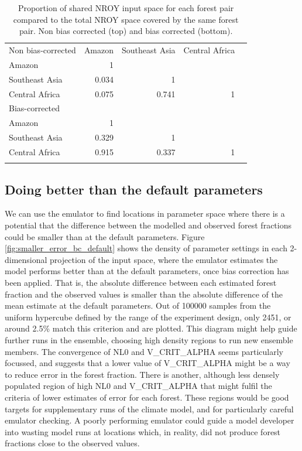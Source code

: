 \documentclass[gmd, manuscript]{copernicus}
\begin{document}
\begin{table}[t]
\caption{Proportion of shared NROY input space for each forest pair compared to the total NROY space covered by the same forest pair. Non bias corrected (top) and bias corrected (bottom).}
\begin{tabular}{lrrrr}
\tophline

Non bias-corrected    & Amazon & Southeast Asia & Central Africa  \\
\middlehline
Amazon                &          1        &             &     \\
Southeast Asia      &        0.034  &           1   &    \\
Central Africa         &    0.075 &  0.741  &   1 \\
\bottomhline

\tophline

Bias-corrected      &   &    & \\
\middlehline
Amazon                &          1        &             &     \\
Southeast Asia      &        0.329  &           1   &    \\
Central Africa         &    0.915 & 0.337  &   1 \\
\bottomhline
\end{tabular}
\belowtable{} %
\label{tab:shared_space}
\end{table}




\subsection{Doing better than the default parameters}\label{ssec:better_than_default}
We can use the emulator to find locations in parameter space where there is a potential that the difference between the modelled and observed forest fractions could be smaller than at the default parameters. Figure \ref{fig:smaller_error_bc_default} shows the density of parameter settings in each 2-dimensional projection of the input space, where the emulator estimates the model performs better than at the default parameters, once bias correction has been applied. That is, the absolute difference between each estimated forest fraction and the observed values is smaller than the absolute difference of the mean estimate at the default parameters. Out of 100000 samples from the uniform hypercube defined by the range of the experiment design, only 2451, or around 2.5\% match this criterion and are plotted. This diagram might help guide further runs in the ensemble, choosing high density regions to run new ensemble members. The convergence of NL0 and V\_CRIT\_ALPHA seems particularly focussed, and suggests that a lower value of V\_CRIT\_ALPHA might be a way to reduce error in the forest fraction. There is another, although less densely populated region of high NL0 and V\_CRIT\_ALPHA that might fulfil the criteria of lower estimates of error for each forest. These regions would be good targets for supplementary runs of the climate model, and for particularly careful emulator checking. A poorly performing emulator could guide a model developer into wasting model runs at locations which, in reality, did not produce forest fractions close to the observed values.
\end{document}
